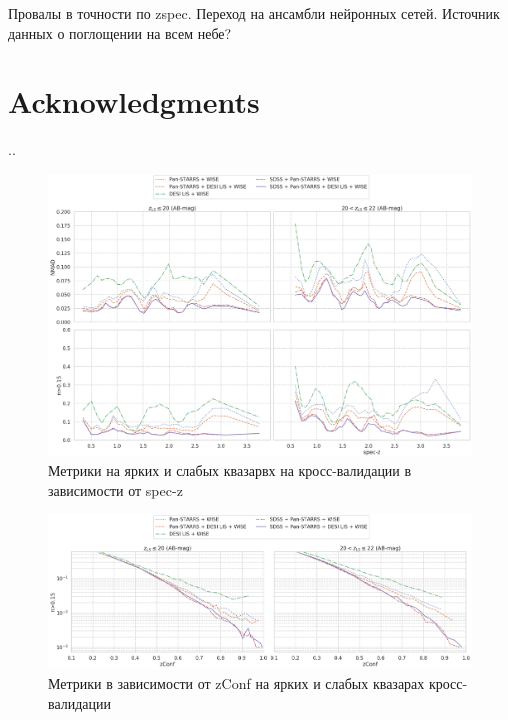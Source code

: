\documentclass[fleqn,usenatbib]{mnras}
\begin{document}
Провалы в точности по zspec. Переход на ансамбли нейронных сетей. Источник данных о поглощении на всем небе?

\clearpage

\section*{Acknowledgments}
..




\appendix

\begin{figure}
    \centering
    \includegraphics[width=0.99\linewidth]{images/class-qso-cv2.png}
    \caption{Метрики на ярких и слабых квазарвх на кросс-валидации в зависимости от spec-z}
    \label{fig:class-galaxy-cv2}
\end{figure}

\begin{figure}
    \centering
    \includegraphics[width=0.99\linewidth]{images/metrics-by-zconf-cv2-qso-by-z-mag}
    \caption{Метрики в зависимости от zConf на ярких и слабых квазарах кросс-валидации}
    \label{fig:metrics-zconf-cv2}
\end{figure}
\end{document}
